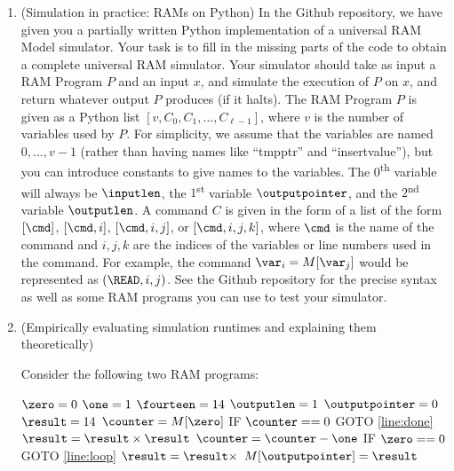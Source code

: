 \documentclass[11pt]{article}
\begin{document}
\begin{enumerate}
 
    \item (Simulation in practice: RAMs on Python)
    In the Github repository, we have given you a partially written Python implementation of a universal RAM Model simulator.  Your task is to fill in the missing parts of the code to obtain a complete universal RAM simulator.
     Your simulator should take as input a RAM Program $P$ and an input $x$, and simulate the execution of $P$ on $x$, and return whatever output $P$ produces (if it halts).  The RAM Program $P$ is given as a Python list $[v,C_0,C_1,\ldots,C_{\ell-1}]$, where $v$ is the number of variables used by $P$.  For simplicity, we assume that the variables are named $0,\ldots,v-1$ (rather than having names like ``tmpptr'' and ``insertvalue''), but you can introduce constants to give names to the variables.  The $0$\textsuperscript{th} variable will always be $\inputlen$, the $1$\textsuperscript{st} variable $\outputpointer$, and the $2$\textsuperscript{nd} variable $\outputlen$.  A command $C$ is given in the form of a list of the form $[\cmd]$, $[\cmd,i]$, $[\cmd,i,j]$, or $[\cmd,i,j,k]$, where $\cmd$ is the name of the command and $i,j,k$ are the indices of the variables or line numbers used in the command.  For example,  the command $\var_i = M[\var_j]$ would be represented as $(\READ,i,j)$.  See the Github repository for the precise syntax as well as some RAM programs you can use to test your simulator.
     
\item (Empirically evaluating simulation runtimes and explaining them theoretically)  

Consider the following two RAM programs:

\begin{algorithm}[H]
\setcounter{AlgoLine}{-1}
$\zero = 0$\;
$\one = 1$\;
$\fourteen = 14$\;
$\outputlen = 1$\;
$\outputpointer = 0$\;
$\result = 14$\;
$\counter = M[\zero]$\;
\Indp
 IF $\counter == 0$ GOTO \ref{line:done}\; \label{line:loop}
$\result = \result \times \result$\;
$\counter = \counter - \one$\;
IF $\zero == 0$ GOTO \ref{line:loop}\;
\Indm
$\result = \result \times $\fourteen\; \label{line:done}
$M[\outputpointer]=\result$\;
\end{algorithm}


\end{enumerate}
\end{document}

